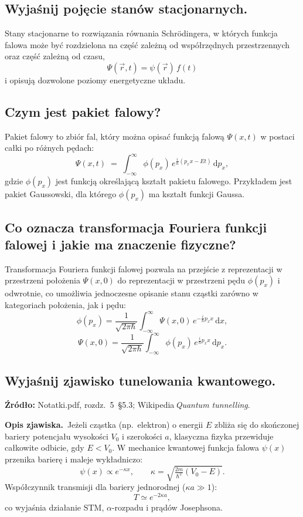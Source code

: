 \subsection{Wyjaśnij pojęcie stanów stacjonarnych.}

Stany stacjonarne to rozwiązania równania Schrödingera, w których funkcja falowa może być rozdzielona na część zależną od współrzędnych przestrzennych oraz część zależną od czasu,
\[
\Psi(\vec r, t) = \psi(\vec r)\,f(t)
\]
i opisują dozwolone poziomy energetyczne układu.

\subsection{Czym jest pakiet falowy?}

Pakiet falowy to zbiór fal, który można opisać funkcją falową \(\Psi(x,t)\) w postaci całki po różnych pędach:
\[
\Psi(x,t)\;=\;\int_{-\infty}^{\infty}\!\phi(p_x)\,e^{\tfrac{i}{\hbar}(p_x x - E t)}\,\mathrm{d}p_x,
\]
gdzie \(\phi(p_x)\) jest funkcją określającą kształt pakietu falowego.  
Przykładem jest pakiet Gaussowski, dla którego \(\phi(p_x)\) ma kształt funkcji Gaussa.

\subsection{Co oznacza transformacja Fouriera funkcji falowej i jakie ma znaczenie fizyczne?}

Transformacja Fouriera funkcji falowej pozwala na przejście z reprezentacji w przestrzeni położenia \(\Psi(x,0)\) do reprezentacji w przestrzeni pędu \(\phi(p_x)\) i odwrotnie, co umożliwia jednoczesne opisanie stanu cząstki zarówno w kategoriach położenia, jak i pędu:
\[
\phi(p_x)
=\frac{1}{\sqrt{2\pi\hbar}}
\int_{-\infty}^{\infty}
\Psi(x,0)\,e^{-\frac{i}{\hbar}p_x x}\,\mathrm{d}x,
\]
\[
\Psi(x,0)
=\frac{1}{\sqrt{2\pi\hbar}}
\int_{-\infty}^{\infty}
\phi(p_x)\,e^{\frac{i}{\hbar}p_x x}\,\mathrm{d}p_x.
\]

\subsection{Wyjaśnij zjawisko tunelowania kwantowego.}

\textbf{Źródło:} Notatki.pdf, rozdz.~5~\S5.3; Wikipedia\,\emph{Quantum tunnelling}.
		
		\vspace{4pt}
		\textbf{Opis zjawiska.}\  
		Jeżeli cząstka (np.~elektron) o energii $E$ zbliża się do skończonej bariery
		potencjału wysokości $V_0$ i szerokości $a$, klasyczna fizyka
		przewiduje całkowite odbicie, gdy $E<V_0$.
		W mechanice kwantowej funkcja falowa $\psi(x)$ przenika barierę i maleje
		wykładniczo:
		\[
		\psi(x)\propto e^{-\kappa x},\qquad \kappa=\sqrt{\tfrac{2m}{\hbar^{2}}(V_0-E)}.
		\]
		Współczynnik transmisji dla bariery jednorodnej ($\kappa a\gg1$):
		\[
		T\simeq e^{-2\kappa a},
		\]
		co wyjaśnia działanie STM, $\alpha$-rozpadu i prądów Josephsona.
		

